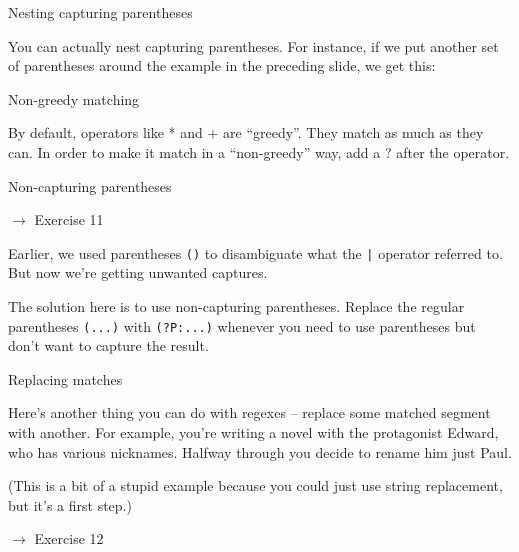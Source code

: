 \documentclass{beamer}
\begin{document}
\begin{frame}{Nesting capturing parentheses}

You can actually nest capturing parentheses. For instance, if we put
another set of parentheses around the example in the preceding slide, 
we get this:

\bigskip



\end{frame}


\begin{frame}{Non-greedy matching}

By default, operators like * and + are ``greedy''. They match as much
as they can. In order to make it match in a ``non-greedy'' way, add a ?
after the operator.



\end{frame}

\begin{frame}{Non-capturing parentheses}

$\rightarrow$ Exercise 11

\bigskip

Earlier, we used parentheses  \lstinline$()$ to disambiguate what the \lstinline$|$ operator
referred to. But now we're getting unwanted captures.

\bigskip

The solution here is to use non-capturing parentheses. Replace the regular 
parentheses  \lstinline$(...)$ with  \lstinline$(?P:...)$ whenever you
need to use parentheses but don't want to capture the result.

\end{frame}

\begin{frame}{Replacing matches}

Here's another thing you can do with regexes -- replace some matched segment
with another. For example, you're writing a novel with the protagonist Edward,
who has various nicknames. Halfway through you decide to rename him just Paul.



(This is a bit of a stupid example because you could just use string replacement,
but it's a first step.)

\bigskip

$\rightarrow$ Exercise 12

\end{frame} 
\end{document}
